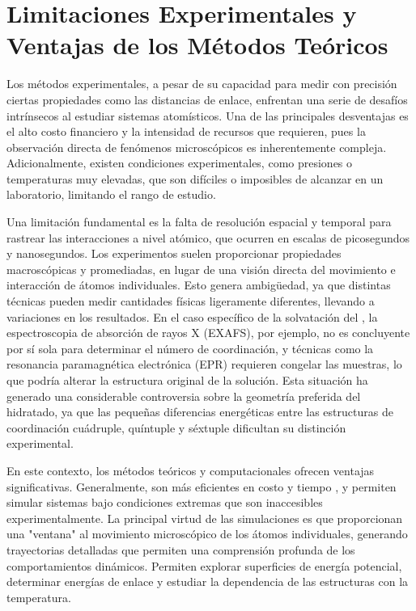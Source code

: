 \section{Limitaciones Experimentales y Ventajas de los Métodos Teóricos}

Los métodos experimentales, a pesar de su capacidad para medir con precisión ciertas propiedades como las distancias de enlace, enfrentan una serie de desafíos intrínsecos al estudiar sistemas atomísticos. Una de las principales desventajas es el alto costo financiero y la intensidad de recursos que requieren, pues la observación directa de fenómenos microscópicos es inherentemente compleja. Adicionalmente, existen condiciones experimentales, como presiones o temperaturas muy elevadas, que son difíciles o imposibles de alcanzar en un laboratorio, limitando el rango de estudio.

Una limitación fundamental es la falta de resolución espacial y temporal para rastrear las interacciones a nivel atómico, que ocurren en escalas de picosegundos y nanosegundos. Los experimentos suelen proporcionar propiedades macroscópicas y promediadas, en lugar de una visión directa del movimiento e interacción de átomos individuales. Esto genera ambigüedad, ya que distintas técnicas pueden medir cantidades físicas ligeramente diferentes, llevando a variaciones en los resultados. En el caso específico de la solvatación del , la espectroscopia de absorción de rayos X (EXAFS), por ejemplo, no es concluyente por sí sola para determinar el número de coordinación, y técnicas como la resonancia paramagnética electrónica (EPR) requieren congelar las muestras, lo que podría alterar la estructura original de la solución. Esta situación ha generado una considerable controversia sobre la geometría preferida del  hidratado, ya que las pequeñas diferencias energéticas entre las estructuras de coordinación cuádruple, quíntuple y séxtuple dificultan su distinción experimental.

En este contexto, los métodos teóricos y computacionales ofrecen ventajas significativas. Generalmente, son más eficientes en costo y tiempo , y permiten simular sistemas bajo condiciones extremas que son inaccesibles experimentalmente. La principal virtud de las simulaciones es que proporcionan una "ventana" al movimiento microscópico de los átomos individuales, generando trayectorias detalladas que permiten una comprensión profunda de los comportamientos dinámicos. Permiten explorar superficies de energía potencial, determinar energías de enlace y estudiar la dependencia de las estructuras con la temperatura.

